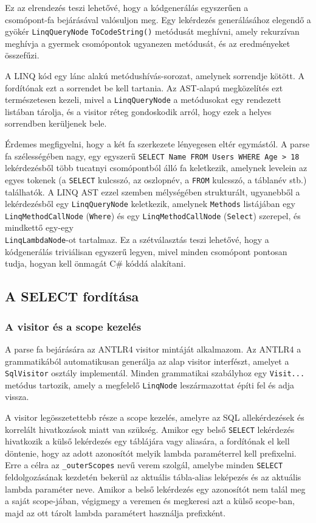 \documentclass[a4paper,12pt]{article}
\begin{document}
Ez az elrendezés teszi lehetővé, hogy a kódgenerálás egyszerűen a \\csomópont-fa bejárásával valósuljon meg. Egy lekérdezés generálásához elegendő a gyökér \texttt{LinqQueryNode} \texttt{ToCodeString()} metódusát meghívni, amely rekurzívan meghívja a gyermek csomópontok ugyanezen metódusát, és az eredményeket összefűzi.

A LINQ kód egy lánc alakú metódushívás-sorozat, amelynek sorrendje kötött. A fordítónak ezt a sorrendet be kell tartania. Az AST-alapú megközelítés ezt természetesen kezeli, mivel a \texttt{LinqQueryNode} a metódusokat egy rendezett listában tárolja, és a visitor réteg gondoskodik arról, hogy ezek a helyes sorrendben kerüljenek bele.

Érdemes megfigyelni, hogy a két fa szerkezete lényegesen eltér egymástól. A parse fa szélességében nagy, egy egyszerű \texttt{SELECT Name FROM Users WHERE Age > 18} lekérdezésből több tucatnyi csomópontból álló fa keletkezik, amelynek levelein az egyes tokenek (a \texttt{SELECT} kulcsszó, az oszlopnév, a \texttt{FROM} kulcsszó, a táblanév stb.) találhatók. A LINQ AST ezzel szemben mélységében strukturált, ugyanebből a lekérdezésből egy \texttt{LinqQueryNode} keletkezik, amelynek \texttt{Methods} listájában egy \texttt{LinqMethodCallNode} (\texttt{Where}) és egy \texttt{LinqMethodCallNode} (\texttt{Select}) szerepel, és mindkettő egy-egy \\\texttt{LinqLambdaNode}-ot tartalmaz. Ez a szétválasztás teszi lehetővé, hogy a kódgenerálás triviálisan egyszerű legyen, mivel minden csomópont pontosan tudja, hogyan kell önmagát C\# kóddá alakítani.

\subsection{A SELECT fordítása}

\subsubsection{A visitor és a scope kezelés}

A parse fa bejárására az ANTLR4 visitor mintáját alkalmazom. Az ANTLR4 a grammatikából automatikusan generálja az alap visitor interfészt, amelyet a \texttt{SqlVisitor} osztály implementál. Minden grammatikai szabályhoz egy \texttt{Visit...} metódus tartozik, amely a megfelelő \texttt{LinqNode} leszármazottat építi fel és adja vissza.

A visitor legösszetettebb része a scope kezelés, amelyre az SQL allekérdezések és korrelált hivatkozások miatt van szükség. Amikor egy belső \texttt{SELECT} lekérdezés hivatkozik a külső lekérdezés egy táblájára vagy aliasára, a fordítónak el kell döntenie, hogy az adott azonosítót melyik lambda paraméterrel kell prefixelni. Erre a célra az \texttt{\_outerScopes} nevű verem szolgál, amelybe minden \texttt{SELECT} feldolgozásának kezdetén bekerül az aktuális tábla-alias leképezés és az aktuális lambda paraméter neve. Amikor a belső lekérdezés egy azonosítót nem talál meg a saját scope-jában, végigmegy a veremen és megkeresi azt a külső scope-ban, majd az ott tárolt lambda paramétert használja prefixként.
\end{document}

